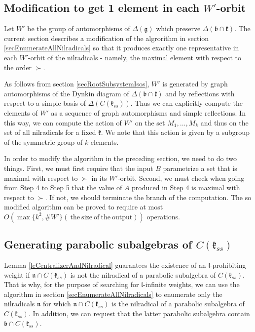 \documentclass[12pt]{report}
\newcommand{\kk}{\mathfrak{k}}
\newcommand{\nn}{\mathfrak{n}}
\newcommand{\gG}{\mathfrak{g}}
\newcommand{\bb}{\mathfrak{b}}
\newcommand{\lL}{\mathfrak{l}}
\begin{document}
\subsection{Modification to get 1 element in each $W'$-orbit }\label{secComputation1elementInOrbit}
Let $W'$ be the group of automorphisms of $\Delta(\gG)$ which preserve $\Delta(\bb\cap\kk)$. The current section describes a modification of the algrorithm in section \ref{secEnumerateAllNilradicals} so that it produces exactly one representative in each $W'$-orbit of the nilradicals - namely, the maximal element with respect to the order $\succ$.

As follows from section \ref{secRootSubsystemIsos}, $W'$ is generated by graph automorphisms of the Dynkin diagram of $\Delta(\bb\cap\kk)$ and by reflections with respect to a simple basis of $\Delta(C(\kk_{ss}))$. Thus we can explicitly compute the elements of $W'$ as a sequence of graph automorphisms and simple reflections. In this way, we can compute the action of $W'$ on the set $M_1,\dots, M_k$ and thus on the set of all nilradicals for a fixed $\kk$. We note that this action is given by a subgroup of the symmetric group of $k$ elements.

In order to modify the algorithm in the preceding section, we need to do two things. First, we must first require that the input $B$ parametrize a set that is maximal with respect to $\succ$ in its $W'$-orbit. Second, we must check when going from Step 4 to Step 5 that the value of $A$ produced in Step 4 is maximal with respect to $\succ$. If not, we should terminate the branch of the computation. The so modified algorithm can be proved to require at most $O(\max\{k^2, \# W'\}(\mathrm{~the~size~of~the~output}))$ operations.
\subsection{Generating parabolic subalgebras of $C(\kk_{ss})$ }\label{secComputingParabolics}
Lemma \ref{leCentralizerAndNilradical} guarantees the existence of an $\lL$-prohibiting weight if $\nn\cap C(\kk_{ss})$ is not the nilradical of a parabolic subalgebra of $C(\kk_{ss})$. That is why, for the purpose of searching for $\lL$-infinite weights, we can use the algorithm in section \ref{secEnumerateAllNilradicals} to enumerate only the nilradicals $\nn$ for which $\nn\cap C(\kk_{ss})$ is the nilradical of a parabolic subalgebra of $C(\kk_{ss})$. In addition, we can request that the latter parabolic subalgebra contain $\bb\cap C(\kk_{ss})$. 
\end{document}
